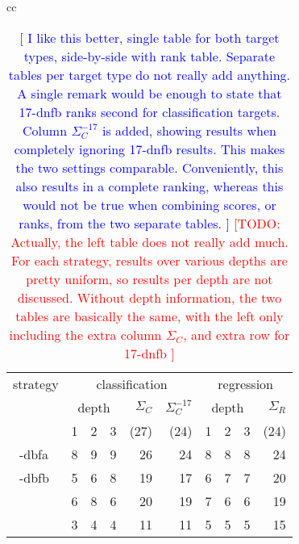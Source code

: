 \documentclass[smallextended]{svjour3}
\newcommand{\todo}[1]{\textcolor{red}{[TODO: #1]}}
\newcommand{\marvin}[1]{\textcolor{blue}{[#1]}}
\newcommand{\dbfa}[1]{1-dbfa}
\newcommand{\dbfb}[1]{2-dbfb}
\newcommand{\dbca}[1]{\ifthenelse{\equal{#1}{0}}{3-dbca}{3-dbca\textsuperscript{#1}}}
\newcommand{\dbcb}[1]{\ifthenelse{\equal{#1}{0}}{4-dbcb}{4-dbcb\textsuperscript{#1}}}
\newcommand{\lmix}{$<$}                   %
\newcommand{\lall}{$\vartriangleleft$}    %
\newcommand{\lasi}{$\blacktriangleleft$}  %
\newcommand{\rmix}{$>$}                   %
\newcommand{\rall}{$\vartriangleright$}   %
\newcommand{\rasi}{$\blacktriangleright$} %
\begin{document}
\begin{table}
\centering
\caption{\marvin{
I like this better, single table for both target types, side-by-side with rank table.
Separate tables per target type do not really add anything.
A single remark would be enough to state that 17-dnfb ranks second for classification targets.
Column $\Sigma_{C}^{-17}$ is added, showing results when completely ignoring 17-dnfb results.
This makes the two settings comparable.
Conveniently, this also results in a complete ranking, whereas this would not be true when combining scores, or ranks, from the two separate tables.
}
\todo{
Actually, the left table does not really add much.
For each strategy, results over various depths are pretty uniform, so results per depth are not discussed.
Without depth information, the two tables are basically the same, with the left only including the extra column $\Sigma_{C}$, and extra row for 17-dnfb
}
}
\label{table:mwu-wins-EXAMPLE}
\begin{tabular}{cc}
\begin{tabular}{l|rrrrr|rrrr}
strategy     & \multicolumn{5}{c|}{classification} & \multicolumn{4}{c}{regression}\\
             & \multicolumn{3}{c}{depth} & $\Sigma_{C}$   & $\Sigma_{C}^{-17}$ & \multicolumn{3}{c}{depth} & $\Sigma_{R}$\\
             & 1 & 2 & 3 & (27) & (24) & 1 & 2 & 3 & (24)\\
\hline
~\:\dbfa{0}  & 8 & 9 & 9 & 26   &   24 & 8 & 8 & 8 & 24\\
~\:\dbfb{0}  & 5 & 6 & 8 & 19   &   17 & 6 & 7 & 7 & 20\\
~\:\dbca{0}  & 6 & 8 & 6 & 20   &   19 & 7 & 6 & 6 & 19\\
~\:\dbcb{0}  & 3 & 4 & 4 & 11   &   11 & 5 & 5 & 5 & 15\\

\end{tabular}
\end{tabular}
\end{table}
\end{document}

